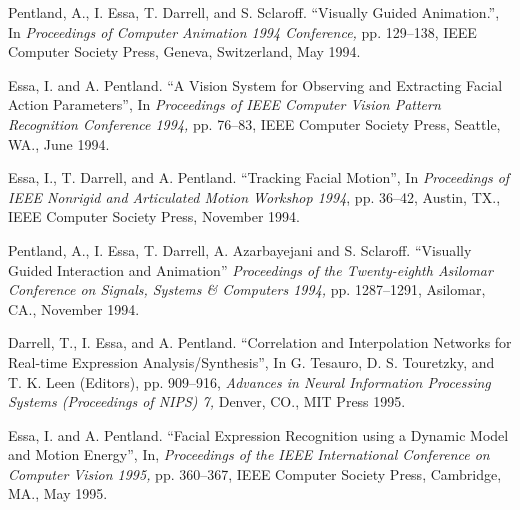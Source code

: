 \begin{pub}

\item Pentland, A., I. Essa, T. Darrell, and S. Sclaroff. ``Visually Guided
Animation.'', In \textit{Proceedings of Computer
Animation 1994 Conference,} pp. 129--138, IEEE Computer Society
Press, Geneva, Switzerland, May 1994. 

\item Essa, I. and A. Pentland. ``A Vision System for Observing and Extracting
Facial Action Parameters'', In \textit{Proceedings of IEEE
Computer Vision Pattern Recognition Conference 1994,} pp. 76--83,
IEEE Computer Society Press, Seattle, WA., June 1994.
 \label{pub:cvpr94}

\item Essa, I., T. Darrell, and A. Pentland. ``Tracking Facial Motion'', In
\textit{Proceedings of IEEE Nonrigid and Articulated Motion
Workshop 1994}, pp. 36--42, Austin, TX., IEEE Computer Society
Press, November 1994. \label{pub:nram94}

\item Pentland, A., I. Essa, T. Darrell, A. Azarbayejani and S. Sclaroff.
``Visually Guided Interaction and Animation'' \textit{Proceedings
of the Twenty-eighth Asilomar Conference on Signals, Systems \&
Computers 1994,} pp. 1287--1291, Asilomar, CA., November 1994.

\item Darrell, T., I. Essa, and A. Pentland. ``Correlation and Interpolation
Networks for Real-time Expression Analysis/Synthesis'', In G.
Tesauro, D. S. Touretzky, and T. K. Leen (Editors), pp. 909--916,
\textit{Advances in Neural Information Processing Systems
(Proceedings of NIPS) 7,} Denver, CO., MIT Press 1995.
 \label{pub:nips95}

\item Essa, I. and A. Pentland. ``Facial Expression Recognition using a Dynamic
Model and Motion Energy'', In,\textit{ Proceedings of the IEEE
International Conference on Computer Vision 1995,} pp. 360--367,
IEEE Computer Society Press, Cambridge, MA., May 1995.
 \label{pub:iccv95}




\end{pub}
